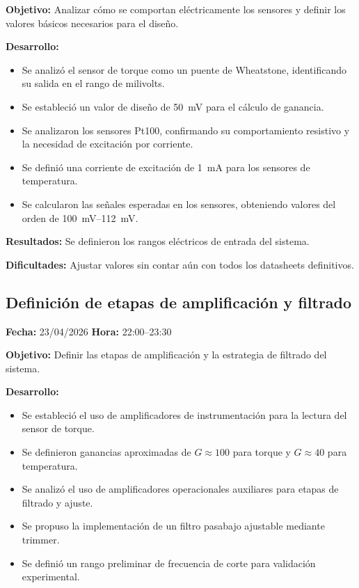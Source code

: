 \documentclass[12pt]{article}
\begin{document}
\textbf{Objetivo:}
Analizar cómo se comportan eléctricamente los sensores y definir los valores básicos necesarios para el diseño.

\textbf{Desarrollo:}
\begin{itemize}
\item Se analizó el sensor de torque como un puente de Wheatstone, identificando su salida en el rango de milivolts.
\item Se estableció un valor de diseño de \SI{50}{mV} para el cálculo de ganancia.
\item Se analizaron los sensores Pt100, confirmando su comportamiento resistivo y la necesidad de excitación por corriente.
\item Se definió una corriente de excitación de \SI{1}{mA} para los sensores de temperatura.
\item Se calcularon las señales esperadas en los sensores, obteniendo valores del orden de \SIrange{100}{112}{mV}.
\end{itemize}

\textbf{Resultados:}
Se definieron los rangos eléctricos de entrada del sistema.

\textbf{Dificultades:}
Ajustar valores sin contar aún con todos los datasheets definitivos.

\subsection{Definición de etapas de amplificación y filtrado}
\textbf{Fecha:} 23/04/2026 \quad \textbf{Hora:} 22:00--23:30

\textbf{Objetivo:}
Definir las etapas de amplificación y la estrategia de filtrado del sistema.

\textbf{Desarrollo:}
\begin{itemize}
\item Se estableció el uso de amplificadores de instrumentación para la lectura del sensor de torque.
\item Se definieron ganancias aproximadas de \(G \approx 100\) para torque y \(G \approx 40\) para temperatura.
\item Se analizó el uso de amplificadores operacionales auxiliares para etapas de filtrado y ajuste.
\item Se propuso la implementación de un filtro pasabajo ajustable mediante trimmer.
\item Se definió un rango preliminar de frecuencia de corte para validación experimental.
\end{itemize}
\end{document}
